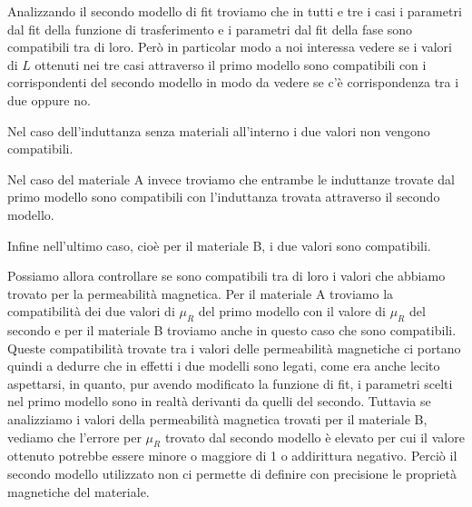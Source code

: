 \documentclass[
    rmp,
    floatfix,
    reprint, 
    superscriptaddress, 
    altaffilletter, 
    amsmath, 
    amssymb, 
    a4paper]{revtex4-2}
\begin{document}
Analizzando il secondo modello di fit troviamo che in tutti e tre i casi i parametri dal fit della funzione di trasferimento e i parametri dal fit della fase sono compatibili tra di loro. Però in particolar modo a noi interessa vedere se i valori di $L$ ottenuti nei tre casi attraverso il primo modello sono compatibili con i corrispondenti del secondo modello in modo da vedere se c'è corrispondenza tra i due oppure no. 

Nel caso dell'induttanza senza materiali all'interno i due valori non vengono compatibili.

Nel caso del materiale A invece troviamo che entrambe le induttanze trovate dal primo modello sono compatibili con l'induttanza trovata attraverso il secondo modello.

Infine nell'ultimo caso, cioè per il materiale B, i due valori sono compatibili. 

Possiamo allora controllare se sono compatibili tra di loro i valori che abbiamo trovato per la permeabilità magnetica. 
Per il materiale A troviamo la compatibilità dei due valori di $\mu_R$ del primo modello con il valore di $\mu_R$ del secondo e per il materiale B troviamo anche in questo caso che sono compatibili. Queste compatibilità trovate tra i valori delle permeabilità magnetiche ci portano quindi a dedurre che in effetti i due modelli sono legati, come era anche lecito aspettarsi, in quanto, pur avendo modificato la funzione di fit, i parametri scelti nel primo modello sono in realtà derivanti da quelli del secondo.
Tuttavia se analizziamo i valori della permeabilità magnetica trovati per il materiale B, vediamo che l'errore per $\mu_R$ trovato dal secondo modello è elevato per cui il valore ottenuto potrebbe essere minore o maggiore di 1 o addirittura negativo. Perciò il secondo modello utilizzato non ci permette di definire con precisione le proprietà magnetiche del materiale. 








\end{document}
